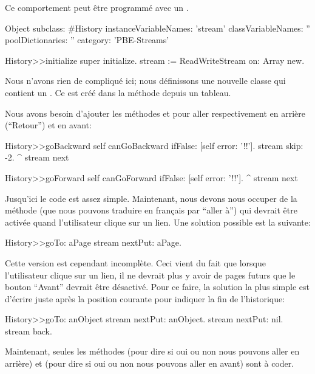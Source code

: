 \documentclass[a4paper,10pt,twoside]{book}
\begin{document}
Ce comportement peut \^etre programm\'e avec un .

\begin{code}{}
Object subclass: #History
  instanceVariableNames: 'stream'
  classVariableNames: ''
  poolDictionaries: ''
  category: 'PBE-Streams'

History>>initialize
    super initialize.
    stream := ReadWriteStream on: Array new.
\end{code}

Nous n'avons rien de compliqu\'e ici; nous d\'efinissons une nouvelle classe
qui contient un \stream. Ce \stream est cr\'eé dans la m\'ethode  
depuis un tableau.

Nous avons besoin d'ajouter les m\'ethodes  et  pour aller respectivement en arri\`ere (``Retour'') et en avant:

\begin{code}{}
History>>goBackward
  self canGoBackward ifFalse: [self error: '!!'].
  stream skip: -2. 
  ^ stream next

History>>goForward
  self canGoForward ifFalse: [self error: '!!'].
  ^ stream next
\end{code}

Jusqu'ici le code est assez simple. Maintenant, nous devons nous occuper
de la m\'ethode  (que nous pouvons traduire en fran\c{c}ais par ``aller \`a'') qui devrait \^etre activ\'ee quand l'utilisateur
clique sur un lien. Une solution possible est la suivante:

\begin{code}{}
History>>goTo: aPage
    stream nextPut: aPage.
\end{code}

Cette version est cependant incompl\`ete. Ceci vient du fait que lorsque l'utilisateur clique sur un lien, il ne devrait plus y avoir de pages futurs \ie
que le bouton ``Avant'' devrait \^etre d\'esactiv\'e.
Pour ce faire, la solution la plus simple est d'\'ecrire 
juste apr\`es la position courante pour indiquer la fin de l'historique:

\begin{code}{}
History>>goTo: anObject
  stream nextPut: anObject.
  stream nextPut: nil.
  stream back.
\end{code}

Maintenant, seules les m\'ethodes  (pour dire si oui ou non nous pouvons aller en arri\`ere) et  (pour dire si oui ou non nous pouvons aller en avant) sont \`a coder.
\end{document}
